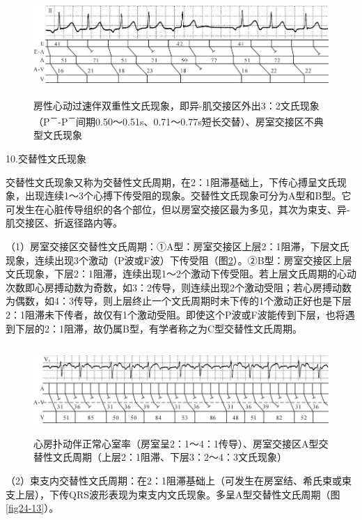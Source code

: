 \begin{figure}[!htbp]
 \centering
 \includegraphics[width=5.83333in,height=1.53125in]{./images/Image00313.jpg}
 \captionsetup{justification=centering}
 \caption{房性心动过速伴双重性文氏现象，即异-肌交接区外出3：2文氏现象（P\textsuperscript{－}-P\textsuperscript{－}间期0.50～0.51s、0.71～0.77s短长交替）、房室交接区不典型文氏现象}
 \label{fig18-12}
  \end{figure} 


10.交替性文氏现象

交替性文氏现象又称为交替性文氏周期，在2：1阻滞基础上，下传心搏呈文氏现象，出现连续1～3个心搏下传受阻的现象。交替性文氏现象可分为A型和B型。它可发生在心脏传导组织的各个部位，但以房室交接区最为多见，其次为束支、异-肌交接区、折返径路内等。

（1）房室交接区交替性文氏周期：①A型：房室交接区上层2：1阻滞，下层文氏现象，连续出现3个激动（P波或F波）下传受阻（图\ref{fig18-13}）。②B型：房室交接区上层文氏现象，下层2：1阻滞，连续出现1～2个激动下传受阻。若上层文氏周期的心动次数即心房搏动数为奇数，如3：2传导，则连续出现2个激动受阻；若心房搏动数为偶数，如4：3传导，则上层终止一个文氏周期时未下传的1个激动正好也是下层2：1阻滞未下传者，故仅有1个激动受阻。即使这个P波或F波能传到下层，也将遇到下层的2：1阻滞，故仍属B型，有学者称之为C型交替性文氏周期。

\begin{figure}[!htbp]
 \centering
 \includegraphics[width=5.77083in,height=1.32292in]{./images/Image00314.jpg}
 \captionsetup{justification=centering}
 \caption{心房扑动伴正常心室率（房室呈2：1～4：1传导）、房室交接区A型交替性文氏周期（上层2：1阻滞、下层3：2～4：3文氏现象）}
 \label{fig18-13}
  \end{figure} 

（2）束支内交替性文氏周期：在2：1阻滞基础上（可发生在房室结、希氏束或束支上层），下传QRS波形表现为束支内文氏现象。多呈A型交替性文氏周期（图\ref{fig24-13}）。

